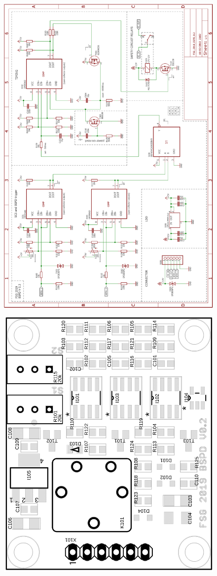 \documentclass[a4paper,12pt,oneside,pdflatex,italian,final,twocolumn]{article}
\begin{document}
\begin{figure}
\centering
\includegraphics[width=1\textwidth,left,]{schematic.png}

\end{figure}

\begin{figure}
\centering
\includegraphics[width=1\textwidth,left,]{board.png}

\end{figure}
\end{document}
